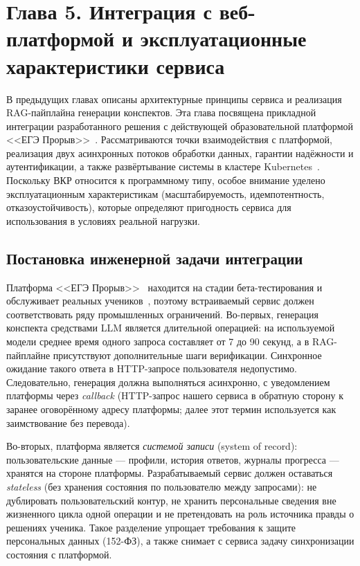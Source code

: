 \documentclass[a4paper,12pt]{extarticle}
\begin{document}
\section{
    Глава 5. Интеграция с веб-платформой и эксплуатационные характеристики сервиса
}
\label{ch:integration}

В предыдущих главах описаны архитектурные принципы сервиса и реализация RAG-пайплайна
генерации конспектов. Эта глава посвящена прикладной интеграции разработанного решения
с действующей образовательной платформой <<ЕГЭ Прорыв>>~\cite{exambreakout2026}. Рассматриваются
точки взаимодействия с платформой, реализация двух асинхронных потоков обработки
данных, гарантии надёжности и аутентификации, а также развёртывание системы в кластере
Kubernetes~\cite{burns2016borg}. Поскольку ВКР относится к программному типу, особое внимание уделено
эксплуатационным характеристикам (масштабируемость, идемпотентность, отказоустойчивость),
которые определяют пригодность сервиса для использования в условиях реальной нагрузки.

\subsection{Постановка инженерной задачи интеграции}

Платформа <<ЕГЭ Прорыв>>~\cite{exambreakout2026} находится на стадии бета-тестирования и обслуживает реальных
учеников~\cite{exambreakout2026}, поэтому встраиваемый сервис должен соответствовать
ряду промышленных ограничений. Во-первых, генерация конспекта средствами LLM является
длительной операцией: на используемой модели среднее время одного запроса составляет
от 7 до 90 секунд, а в RAG-пайплайне присутствуют дополнительные шаги верификации.
Синхронное ожидание такого ответа в HTTP-запросе пользователя недопустимо. Следовательно,
генерация должна выполняться асинхронно, с уведомлением платформы через
\textit{callback} (HTTP-запрос нашего сервиса в обратную сторону к заранее
оговорённому адресу платформы; далее этот термин используется как заимствование
без перевода).

Во-вторых, платформа является \textit{системой записи} (system of record): пользовательские
данные --- профили, история ответов, журналы прогресса --- хранятся на стороне платформы.
Разрабатываемый сервис должен оставаться \textit{stateless} (без хранения состояния
по пользователю между запросами): не дублировать пользовательский контур, не хранить
персональные сведения вне жизненного цикла одной операции и не претендовать на роль
источника правды о решениях ученика. Такое разделение упрощает требования к защите
персональных данных (152-ФЗ), а также снимает с сервиса задачу синхронизации
состояния с платформой.
\end{document}
